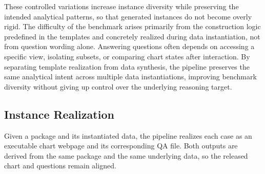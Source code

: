 \documentclass[review,journal,hideappendix]{vgtc} %
\begin{document}

These controlled variations increase instance diversity while preserving the intended analytical patterns, so that generated instances do not become overly rigid. The difficulty of the benchmark arises primarily from the construction logic predefined in the templates and concretely realized during data instantiation, not from question wording alone. Answering questions often depends on accessing a specific view, isolating subsets, or comparing chart states after interaction. By separating template realization from data synthesis, the pipeline preserves the same analytical intent across multiple data instantiations, improving benchmark diversity without giving up control over the underlying reasoning target.

\subsection{Instance Realization}

Given a package and its instantiated data, the pipeline realizes each case as an executable chart webpage and its corresponding QA file. Both outputs are derived from the same package and the same underlying data, so the released chart and questions remain aligned.
\end{document}

